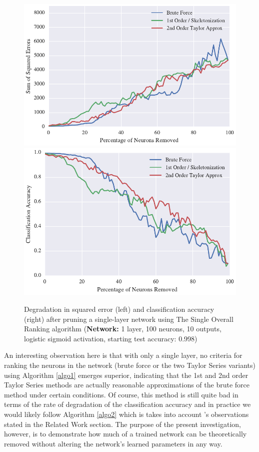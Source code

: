 \begin{figure}[!ht]
\centering
\includegraphics[width=0.49\linewidth]{png/mnist-acc99-single-pass-method.pdf}
\includegraphics[width=0.49\linewidth]{png/mnist-acc99-single-pass-accuracy.pdf}
\caption{Degradation in squared error (left) and classification accuracy (right) after pruning a single-layer network using The Single Overall Ranking algorithm (\textbf{Network:} 1 layer, 100 neurons, 10 outputs, logistic sigmoid activation, starting test accuracy: 0.998)}
\label{fig:mnist-single-ranking-single-layer}
\end{figure}

An interesting observation here is that with only a single layer, no criteria for ranking the neurons in the network (brute force or the two Taylor Series variants) using Algorithm \ref{algo1} emerges superior, indicating that the 1st and 2nd order Taylor Series methods are actually reasonable approximations of the brute force method under certain conditions. Of course, this method is still quite bad in terms of the rate of degradation of the classification accuracy and in practice we would likely follow Algorithm \ref{algo2} which is takes into account \cite{mozer1989skeletonization}'s observations stated in the Related Work section. The purpose of the present investigation, however, is to demonstrate how much of a trained network can be theoretically removed without altering the network's learned parameters in any way.

